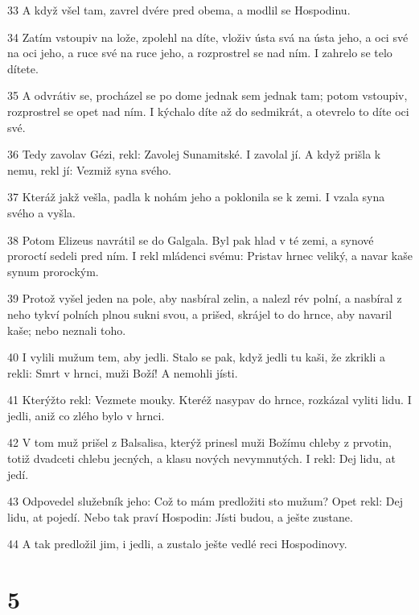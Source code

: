 \par 33 A když všel tam, zavrel dvére pred obema, a modlil se Hospodinu.
\par 34 Zatím vstoupiv na lože, zpolehl na díte, vloživ ústa svá na ústa jeho, a oci své na oci jeho, a ruce své na ruce jeho, a rozprostrel se nad ním. I zahrelo se telo dítete.
\par 35 A odvrátiv se, procházel se po dome jednak sem jednak tam; potom vstoupiv, rozprostrel se opet nad ním. I kýchalo díte až do sedmikrát, a otevrelo to díte oci své.
\par 36 Tedy zavolav Gézi, rekl: Zavolej Sunamitské. I zavolal jí. A když prišla k nemu, rekl jí: Vezmiž syna svého.
\par 37 Kteráž jakž vešla, padla k nohám jeho a poklonila se k zemi. I vzala syna svého a vyšla.
\par 38 Potom Elizeus navrátil se do Galgala. Byl pak hlad v té zemi, a synové proroctí sedeli pred ním. I rekl mládenci svému: Pristav hrnec veliký, a navar kaše synum prorockým.
\par 39 Protož vyšel jeden na pole, aby nasbíral zelin, a nalezl rév polní, a nasbíral z neho tykví polních plnou sukni svou, a prišed, skrájel to do hrnce, aby navaril kaše; nebo neznali toho.
\par 40 I vylili mužum tem, aby jedli. Stalo se pak, když jedli tu kaši, že zkrikli a rekli: Smrt v hrnci, muži Boží! A nemohli jísti.
\par 41 Kterýžto rekl: Vezmete mouky. Kteréž nasypav do hrnce, rozkázal vyliti lidu. I jedli, aniž co zlého bylo v hrnci.
\par 42 V tom muž prišel z Balsalisa, kterýž prinesl muži Božímu chleby z prvotin, totiž dvadceti chlebu jecných, a klasu nových nevymnutých. I rekl: Dej lidu, at jedí.
\par 43 Odpovedel služebník jeho: Což to mám predložiti sto mužum? Opet rekl: Dej lidu, at pojedí. Nebo tak praví Hospodin: Jísti budou, a ješte zustane.
\par 44 A tak predložil jim, i jedli, a zustalo ješte vedlé reci Hospodinovy.

\chapter{5}

